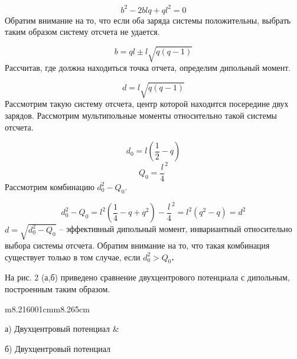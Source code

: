 \documentclass[a4paper]{article}
\makeatletter
\newcommand\arraybslash{\let\\\@arraycr}
\makeatother
\begin{document}
\begin{equation*}
b^2-2\mathit{blq}+ql^2=0
\end{equation*}
Обратим внимание на то, что если оба заряда системы положительны, выбрать таким образом систему отсчета не удается.

\begin{equation*}
b=\mathit{ql}\pm l\sqrt{q\left(q-1\right)}
\end{equation*}
Рассчитав, где должна находиться точка отчета, определим дипольный момент.

\begin{equation*}
d=l\sqrt{q\left(q-1\right)}
\end{equation*}
Рассмотрим такую систему отсчета, центр которой находится посередине двух зарядов. Рассмотрим мультипольные моменты относительно такой системы отсчета.

\begin{equation*}
d_0=l\left(\frac 1 2-q\right)
\end{equation*}
\begin{equation*}
Q_0=\frac l 4^2
\end{equation*}
Рассмотрим
комбинацию  $d_0^2-Q_0$.

\begin{equation*}
d_0^2-Q_0=l^2\left(\frac 1 4-q+q^2\right)-\frac l 4^2=l^2\left(q^2-q\right)=d^2
\end{equation*}
 $d=\sqrt{d_0^2-Q_0}$ -- эффективный
дипольный момент, инвариантный относительно выбора системы отсчета. Обратим внимание на то, что такая комбинация существует только в том
случае, если  $d_0^2>Q_0$\textbf{.}

На рис. 2 (а,б) приведено сравнение двухцентрового потенциала с дипольным, построенным таким образом.

\begin{flushleft}
\tablefirsthead{}
\tablehead{}
\tabletail{}
\tablelasttail{}
\begin{supertabular}{m{8.216001cm}m{8.265cm}}
{%
 \par}
\centering а) Двухцентровый
потенциал &
{%
 \par}
\centering\arraybslash б)
Двухцентровый
потенциал\\
\\
\end{supertabular}
\end{flushleft}
\end{document}
